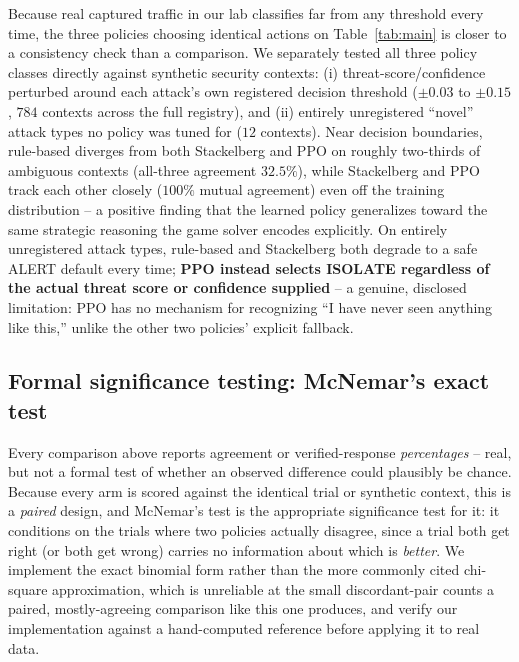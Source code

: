 \documentclass[conference]{IEEEtran}
\begin{document}
Because real captured traffic in our lab classifies far from any threshold every time, the three
policies choosing identical actions on Table~\ref{tab:main} is closer to a consistency check than
a comparison. We separately tested all three policy classes directly against synthetic security
contexts: (i) threat-score/confidence perturbed around each attack's own registered decision
threshold ($\pm0.03$ to $\pm0.15$, $784$ contexts across the full registry), and (ii) entirely
unregistered ``novel'' attack types no policy was tuned for ($12$ contexts). Near decision
boundaries, rule-based diverges from both Stackelberg and PPO on roughly two-thirds of ambiguous
contexts (all-three agreement $32.5\%$), while Stackelberg and PPO track each other closely
($100\%$ mutual agreement) even off the training distribution -- a positive finding that the
learned policy generalizes toward the same strategic reasoning the game solver encodes explicitly.
On entirely unregistered attack types, rule-based and Stackelberg both degrade to a safe ALERT
default every time; \textbf{PPO instead selects ISOLATE regardless of the actual threat score or
confidence supplied} -- a genuine, disclosed limitation: PPO has no mechanism for recognizing
``I have never seen anything like this,'' unlike the other two policies' explicit fallback.

\subsection{Formal significance testing: McNemar's exact test}
\label{sec:mcnemar}

Every comparison above reports agreement or verified-response \emph{percentages} -- real, but not
a formal test of whether an observed difference could plausibly be chance. Because every arm is
scored against the identical trial or synthetic context, this is a \emph{paired} design, and
McNemar's test is the appropriate significance test for it: it conditions on the trials where two
policies actually disagree, since a trial both get right (or both get wrong) carries no
information about which is \emph{better}. We implement the exact binomial form rather than the
more commonly cited chi-square approximation, which is unreliable at the small discordant-pair
counts a paired, mostly-agreeing comparison like this one produces, and verify our implementation
against a hand-computed reference before applying it to real data.
\end{document}
